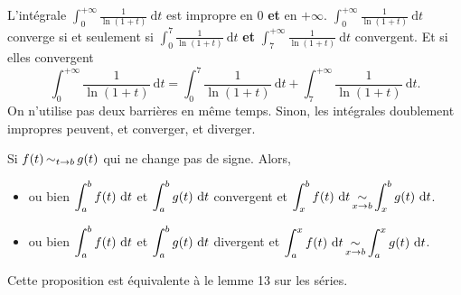 \begin{rmkn}
	L'intégrale $\int_{0}^{+\infty} \frac{1}{\ln(1+t)}~\mathrm{d}t$\/ est impropre en 0 {\bf et}\/ en $+\infty$. $\int_{0}^{+\infty} \frac{1}{\ln(1+t)}~\mathrm{d}t$\/ converge si et seulement si $\int_{0}^{7} \frac{1}{\ln(1+t)}~\mathrm{d}t$\/ {\bf et}\/ $\int_{7}^{+\infty} \frac{1}{\ln(1+t)}~\mathrm{d}t$\/ convergent.
	Et si elles convergent \[
		\int_{0}^{+\infty} \frac{1}{\ln(1+t)}~\mathrm{d}t = \int_{0}^{7} \frac{1}{\ln(1+t)}~\mathrm{d}t + \int_{7}^{+\infty} \frac{1}{\ln(1+t)}~\mathrm{d}t
	.\]
	On n'utilise pas deux barrières en même temps. Sinon, les intégrales doublement impropres peuvent, et converger, et diverger.
\end{rmkn}

\begin{prop}
	Si $f(t) \operatorname*{\sim}_{t\to b} g(t)$\/ qui ne change pas de signe. Alors,
	\begin{itemize}
		\item ou bien $\displaystyle\int_{a}^{b} f(t)~\mathrm{d}t$\/ et $\displaystyle\int_{a}^{b} g(t)~\mathrm{d}t$\/ convergent et $\displaystyle \int_{x}^{b} f(t)~\mathrm{d}t \operatorname*{\sim}_{x\to b} \int_{x}^{b} g(t)~\mathrm{d}t$.
		\item ou bien $\displaystyle\int_{a}^{b} f(t)~\mathrm{d}t$\/ et $\displaystyle\int_{a}^{b} g(t)~\mathrm{d}t$\/ divergent et $\displaystyle\int_{a}^{x} f(t)~\mathrm{d}t \operatorname*{\sim}_{x\to b} \int_{a}^{x} g(t)~\mathrm{d}t$.
	\end{itemize}
	Cette proposition est équivalente à le {\sc lemme}\/ 13 sur les séries.
\end{prop}


